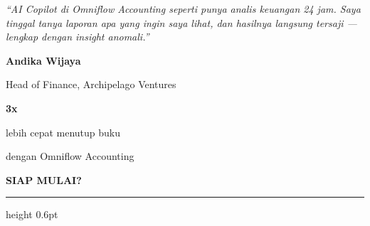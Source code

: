 \documentclass[a4paper]{article}
\newcommand{\sectiontitle}[1]{%
    \vspace{10pt}%
    {\fontsize{13}{16}\selectfont\bfseries\color{BlueDark} #1}\par\vspace{3pt}%
    {\color{BluePrimary}\hrule height 0.6pt}\par\vspace{8pt}%
}
\begin{document}
\noindent
\begin{minipage}[t]{0.485\textwidth}
    \colorbox{BlueBg}{%
        \begin{minipage}{\dimexpr\linewidth-2\fboxsep\relax}
            {\fontsize{9.5}{13}\selectfont\color{TextDark}\textit{``AI Copilot di Omniflow Accounting seperti punya analis keuangan 24 jam. Saya tinggal tanya laporan apa yang ingin saya lihat, dan hasilnya langsung tersaji — lengkap dengan insight anomali.''}}%
            \par\vspace{4pt}
            {\fontsize{8.5}{11}\selectfont\bfseries\color{BluePrimary} Andika Wijaya}\par
            {\fontsize{8}{10}\selectfont\color{TextLight} Head of Finance, Archipelago Ventures}
        \end{minipage}}
\end{minipage}%
\hfill
\begin{minipage}[t]{0.485\textwidth}
    \colorbox{BlueBg}{%
        \begin{minipage}{\dimexpr\linewidth-2\fboxsep\relax}
            \begin{center}
                {\fontsize{20}{24}\selectfont\bfseries\color{BluePrimary} 3x}\par
                {\fontsize{9.5}{12}\selectfont\color{TextDark} lebih cepat menutup buku}\par
                {\fontsize{9.5}{12}\selectfont\color{TextDark} dengan Omniflow Accounting}
            \end{center}
        \end{minipage}}
\end{minipage}

\sectiontitle{SIAP MULAI?}
\end{document}
